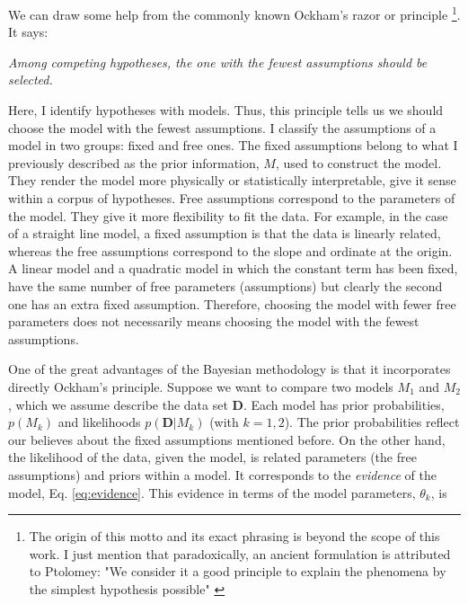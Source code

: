 We can draw some help from the commonly known Ockham's razor or principle \footnote{The origin of this motto and its exact phrasing is beyond the scope of this work. I just mention that paradoxically, an ancient formulation is attributed to Ptolomey: "We consider it a good principle to explain the phenomena by the simplest hypothesis possible" \citep{Franklin2001}}. It says:

\textit{Among competing hypotheses, the one with the fewest assumptions should be selected.}

Here, I identify hypotheses with models. Thus, this principle tells us we should choose the model with the fewest assumptions. I classify the assumptions of a model in two groups: fixed and free ones. The fixed assumptions belong to what I previously described as the prior information, $M$, used to construct the model. They render the model more physically or statistically interpretable, give it sense within a corpus of hypotheses. Free assumptions correspond to the parameters of the model. They give it more flexibility to fit the data. For example, in the case of a straight line model, a fixed assumption is that the data is linearly related, whereas the free assumptions correspond to the slope and ordinate at the origin. A linear model and a quadratic model in which the constant term has been fixed, have the same number of free parameters (assumptions) but clearly the second one has an extra fixed assumption. Therefore, choosing the model with fewer free parameters does not necessarily means choosing the model with the fewest assumptions.

One of the great advantages of the Bayesian methodology is that it incorporates directly Ockham's principle. Suppose we want to compare two models $M_1$ and $M_2$, which we assume describe the data set $\mathbf{D}$. Each model has prior probabilities, $p(M_k)$ and likelihoods $p(\mathbf{D}|M_k)$ (with $k=1,2$). The prior probabilities reflect our believes about the fixed assumptions mentioned before. On the other hand, the likelihood of the data, given the model, is related parameters (the free assumptions) and priors within a model. It corresponds to the \emph{evidence} of the model, Eq. \ref{eq:evidence}. This evidence in terms of the model parameters, $\theta_k$, is

